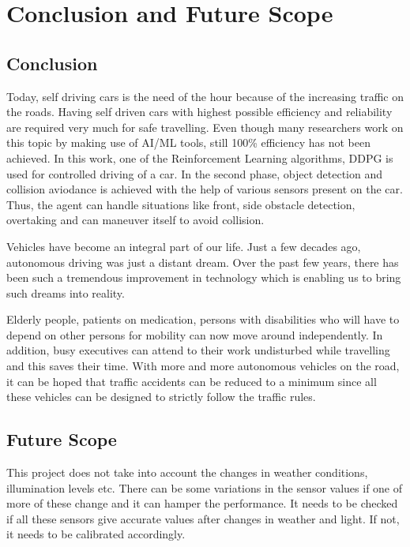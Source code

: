\chapter{Conclusion and Future Scope}

\section{Conclusion}

Today, self driving cars is the need of the hour because of the increasing traffic on the roads. Having self driven cars with highest possible efficiency and reliability are required very much for safe travelling. Even though many researchers work on this topic by making use of AI/ML tools, still 100\% efficiency has not been achieved. 
In this work, one of the Reinforcement Learning algorithms, DDPG is used for controlled driving of a car. In the second phase, object detection and collision aviodance is achieved with the help of various sensors present on the car. Thus, the agent can handle situations like front, side obstacle detection, overtaking and can  maneuver itself to avoid collision. 

Vehicles have become an integral part of our life. Just a few decades ago, autonomous driving was just a distant dream. Over the past few years, there has been such a tremendous improvement in technology which is enabling us to bring such dreams into reality. 

Elderly people, patients on medication, persons with disabilities who will have to depend on other persons for mobility can now move around independently.
In addition, busy executives can attend to their work undisturbed while travelling and this saves their time. With more and more autonomous vehicles on the road, it can be hoped that traffic accidents can be reduced to a minimum since all these vehicles can be designed to strictly follow  the traffic rules. 


\section{Future Scope}
This project does not take into account the changes in weather conditions, illumination levels etc. There can be some variations in the sensor values if one of more of these change and it can hamper the performance. It needs to be checked if all these sensors give accurate values after changes in weather and light. If not, it needs to be calibrated accordingly. 


